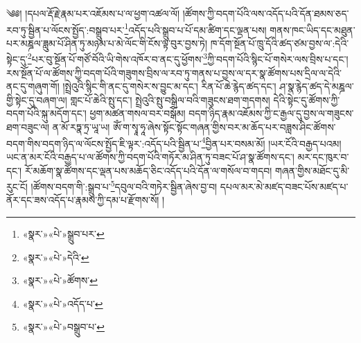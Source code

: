 ༄༅། །དཔལ་རྡོ་རྗེ་རྣམ་པར་འཇོམས་པ་ལ་ཕྱག་འཚལ་ལོ། །ཚོགས་ཀྱི་བདག་པོའི་ལས་འདོད་པའི་དོན་ཐམས་ཅད་རབ་ཏུ་སྦྱིན་པ་ལོངས་སྤྱོད་:བསྒྲུབ་པར་\footnote{«སྣར་»«པེ་»སྒྲུབ་པར་}འདོད་པའི་སྒྲུབ་པ་པོ་དམ་ཚིག་དང་ལྡན་པས། གནས་ཁང་ཡིད་དང་མཐུན་པར་མཎྜལ་ཟླུམ་པོ་ཤིན་ཏུ་མཉམ་པ་མེ་ལོང་གི་ངོས་ལྟ་བུར་བྱས་ཏེ། ཁ་དོག་སྔོན་པོ་ཁྲུ་དོའི་ཚད་ཙམ་བྱས་ལ་:དེའི་སྟེང་དུ་\footnote{«སྣར་»«པེ་»དེའི་}པར་བུ་སྔོན་པོ་གཙོ་བོའི་ཡི་གེས་འཁོར་བ་ནང་དུ་ཕྱོགས་\footnote{«སྣར་»«པེ་»ཚོགས་}ཀྱི་བདག་པོའི་སྙིང་པོ་གསེར་ལས་བྲིས་པ་དང་། རས་སྔོན་པོ་ལ་ཚོགས་ཀྱི་བདག་པོའི་གཟུགས་བྲིས་ལ་རབ་ཏུ་གནས་པ་བྱས་ལ་དར་སྣ་ཚོགས་པས་དྲིལ་ལ་དེའི་ནང་དུ་གཞུག་གོ། །སྤྲེའུའི་སྙིང་གི་ནང་དུ་གསེར་ས་བྱུང་མ་དང་། རིན་པོ་ཆེ་རྙེད་ཚད་དང་། ཤ་སྣ་རྙེད་ཚད་དེ་མཎྜལ་གྱི་སྟེང་དུ་བཞག་ལ། གླང་པོ་ཆེའི་སྤུ་དང་། སྤྲེའུའི་སྤུ་བསྒྲིལ་བའི་གཟུངས་ཐག་གདགས། དེའི་སྟེང་དུ་ཚོགས་ཀྱི་བདག་པོའི་སྐུ་མདོག་དང་། ཕྱག་མཚན་གསལ་བར་བསྒོམ། བདག་ཉིད་རྣམ་འཇོམས་ཀྱི་ང་རྒྱལ་དུ་བྱས་ལ་གཟུངས་ཐག་བཟུང་ལ། ན་མོ་རཏྣ་ཏྲ་ཡཱ་ཡ། ཨོཾ་ག་སྭཱ་ཧཱ་ཞེས་སྟོང་སྟོང་གཞན་གྱིས་བར་མ་ཆོད་པར་བཟླས་ཤིང་ཚོགས་བདག་གིས་བདག་ཉིད་ལ་ལོངས་སྤྱོད་ཇི་ལྟར་:འདོད་པའི་སྦྱིན་པ་\footnote{«སྣར་»«པེ་»འདོད་པ་}བྱིན་པར་བསམ་མོ། །ཡར་ངོའི་བརྒྱད་པའམ། ཡང་ན་མར་ངོའི་བརྒྱད་པ་ལ་ཚོགས་ཀྱི་བདག་པོའི་གཏོར་མ་ཤིན་ཏུ་བཟང་པོ་ཤ་སྣ་ཚོགས་དང་། མར་དང་ཁུར་བ་དང་། རོ་མཆོག་སྣ་ཚོགས་དང་ལྡན་པས་མཆོད་ཅིང་འདོད་པའི་དོན་ལ་གསོལ་བ་གདབ། གཞན་གྱིས་མཐོང་དུ་མི་རུང་ངོ། །ཚོགས་བདག་གི་:སྒྲུབ་པ་\footnote{«སྣར་»«པེ་»བསྒྲུབ་པ་}དབུལ་བའི་གཏེར་སྦྱིན་ཞེས་བྱ་བ། དཔལ་མར་མེ་མཛད་བཟང་པོས་མཛད་པ་ནོར་དང་ཟས་འདོད་པ་རྣམས་ཀྱི་དམ་པ་རྫོགས་སོ། ། 